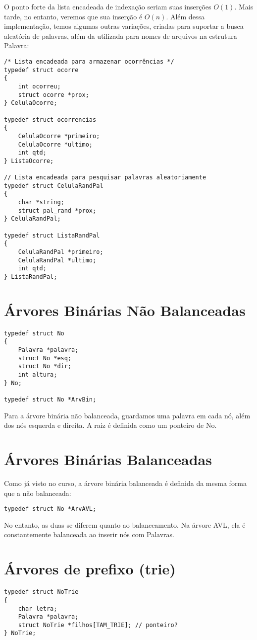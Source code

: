 O ponto forte da lista encadeada de indexação seriam suas inserções $O(1)$. Mais tarde, no entanto, veremos que sua inserção é $O(n)$. Além dessa implementação, temos algumas outras variações, criadas para suportar a busca aleatória de palavras, além da utilizada para nomes de arquivos na estrutura Palavra:

\begin{lstlisting}
/* Lista encadeada para armazenar ocorrências */
typedef struct ocorre
{
    int ocorreu;
    struct ocorre *prox;
} CelulaOcorre;

typedef struct ocorrencias
{
    CelulaOcorre *primeiro;
    CelulaOcorre *ultimo;
    int qtd;
} ListaOcorre;

// Lista encadeada para pesquisar palavras aleatoriamente
typedef struct CelulaRandPal
{
    char *string;
    struct pal_rand *prox;
} CelulaRandPal;

typedef struct ListaRandPal
{
    CelulaRandPal *primeiro;
    CelulaRandPal *ultimo;
    int qtd;
} ListaRandPal;
\end{lstlisting}


\section{Árvores Binárias Não Balanceadas}\label{tadArvBin}
\begin{lstlisting}
typedef struct No
{
    Palavra *palavra;
    struct No *esq;
    struct No *dir;
    int altura;
} No;

typedef struct No *ArvBin;
\end{lstlisting}

Para a árvore binária não balanceada, guardamos uma palavra em cada nó, além dos nós esquerda e direita. A raiz é definida como um ponteiro de No.

\section{Árvores Binárias Balanceadas}\label{tadAVL}
Como já visto no curso, a árvore binária balanceada é definida da mesma forma que a não balanceada:
\begin{lstlisting}
typedef struct No *ArvAVL;
\end{lstlisting}

No entanto, as duas se diferem quanto ao balanceamento. Na árvore AVL, ela é constantemente balanceada ao inserir nós com Palavras.

\section{Árvores de prefixo (trie)}\label{tadTrie}
\begin{lstlisting}
typedef struct NoTrie
{
    char letra;
    Palavra *palavra;
    struct NoTrie *filhos[TAM_TRIE]; // ponteiro?
} NoTrie;
\end{lstlisting}

